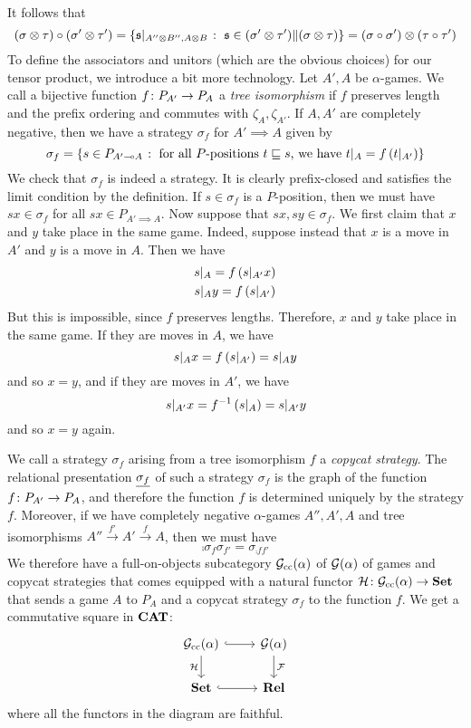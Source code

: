 \documentclass[11pt]{article} %
\begin{document}
It follows that
\[
  (\sigma\otimes\tau) \circ (\sigma'\otimes\tau')
  = \left\{\mathfrak s\vert_{A''\otimes B'', A\otimes B}\;\colon\;\mathfrak s\in(\sigma'\otimes\tau')\|(\sigma\otimes\tau)\right\}
  = (\sigma \circ \sigma')\otimes(\tau \circ \tau')
  \]
To define the associators and unitors (which are the obvious choices) for our tensor product, we introduce a bit more technology.  Let $A',A$ be $\alpha$-games.  We call a bijective function $f\colon{}P_{A'}\to{}P_A$ a \emph{tree isomorphism} if $f$ preserves length and the prefix ordering and commutes with $\zeta_A,\zeta_{A'}$.  If $A,A'$ are completely negative, then we have a strategy $\sigma_f$ for $A'\implies A$ given by
\[
  \sigma_f = \left\{s\in P_{A'\multimap A}\;\colon\; \textrm{for all $P$-positions $t\sqsubseteq s$, we have $t\vert_A = f\left(t\vert_{A'}\right)$}\right\}
  \]
We check that $\sigma_f$ is indeed a strategy.  It is clearly prefix-closed and satisfies the limit condition by the definition.  If $s\in\sigma_f$ is a $P$-position, then we must have $sx\in\sigma_f$ for all $sx\in P_{A'\implies A}$.  Now suppose that $sx,sy\in \sigma_f$.  We first claim that $x$ and $y$ take place in the same game.  Indeed, suppose instead that $x$ is a move in $A'$ and $y$ is a move in $A$.  Then we have
\begin{gather*}
  s\vert_A = f\left({s\vert_{A'}x}\right) \\
  s\vert_Ay = f\left({s\vert_{A'}}\right)
\end{gather*}
But this is impossible, since $f$ preserves lengths.  Therefore, $x$ and $y$ take place in the same game.  If they are moves in $A$, we have
\[
  s\vert_A x = f\left({s\vert_{A'}}\right) = s\vert_Ay
  \]
and so $x=y$, and if they are moves in $A'$, we have
\[
  s\vert_{A'}x = f^{-1}\left({s\vert_A}\right) = s\vert_{A'}y
  \]
and so $x=y$ again.

We call a strategy $\sigma_f$ arising from a tree isomorphism $f$ a \emph{copycat strategy}.  The relational presentation $\underline{\sigma_f}$ of such a strategy $\sigma_f$ is the graph of the function $f\colon{}P_{A'}\to{}P_A$, and therefore the function $f$ is determined uniquely by the strategy $f$.  Moreover, if we have completely negative $\alpha$-games $A'', A', A$ and tree isomorphisms $A''\xrightarrow{f'}A'\xrightarrow{f}A$, then we must have
\[
  \comp{\sigma_f}{\sigma_{f'}} = \sigma_{\comp{f}{f'}}
  \]
We therefore have a full-on-objects subcategory $\mathcal G_{\operatorname{cc}}(\alpha)$ of $\mathcal G(\alpha)$ of games and copycat strategies that comes equipped with a natural functor $\mathcal H\colon{}\mathcal G_{\operatorname{cc}}(\alpha)\to{}{\normalfont\textbf{Set}}$ that sends a game $A$ to $P_A$ and a copycat strategy $\sigma_f$ to the function $f$.  We get a commutative square in ${\normalfont\textbf{CAT}}$:
\[
  \begin{tikzcd}
    \G_{\cc}(\alpha) \arrow[r, hook] \arrow[d, "\H"']
      & \G(\alpha) \arrow[d, "\F"] \\
    \Set \arrow[r, hook]
      & \Rel
  \end{tikzcd}
  \]
where all the functors in the diagram are faithful.  
\end{document}

